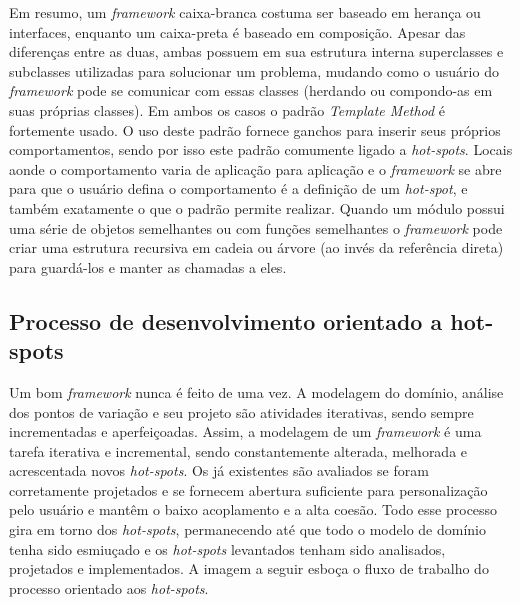 Em resumo, um \textit{framework} caixa-branca costuma ser baseado em herança ou interfaces, enquanto um caixa-preta é baseado em composição. Apesar das diferenças entre as duas, ambas possuem em sua estrutura interna superclasses e subclasses utilizadas para solucionar um problema, mudando como o usuário do \textit{framework} pode se comunicar com essas classes (herdando ou compondo-as em suas próprias classes). Em ambos os casos o padrão \textit{Template Method} é fortemente usado. O uso deste padrão fornece ganchos para inserir seus próprios comportamentos, sendo por isso este padrão comumente ligado a \textit{hot-spots}. Locais aonde o comportamento varia de aplicação para aplicação e o \textit{framework} se abre para que o usuário defina o comportamento é a definição de um \textit{hot-spot}, e também exatamente o que o padrão permite realizar. Quando um módulo possui uma série de objetos semelhantes ou com funções semelhantes o \textit{framework} pode criar uma estrutura recursiva em cadeia ou árvore (ao invés da referência direta) para guardá-los e manter as chamadas a eles.

\subsection{Processo de desenvolvimento orientado a hot-spots}

Um bom \textit{framework} nunca é feito de uma vez. A modelagem do domínio, análise dos pontos de variação e seu projeto são atividades iterativas, sendo sempre incrementadas e aperfeiçoadas. Assim, a modelagem de um \textit{framework} é uma tarefa iterativa e incremental, sendo constantemente alterada, melhorada e acrescentada novos \textit{hot-spots}. Os já existentes são avaliados se foram corretamente projetados e se fornecem abertura suficiente para personalização pelo usuário e mantêm o baixo acoplamento e a alta coesão. Todo esse processo gira em torno dos \textit{hot-spots}, permanecendo até que todo o modelo de domínio tenha sido esmiuçado e os \textit{hot-spots} levantados tenham sido analisados, projetados e implementados. A imagem a seguir esboça o fluxo de trabalho do processo orientado aos \textit{hot-spots}.

